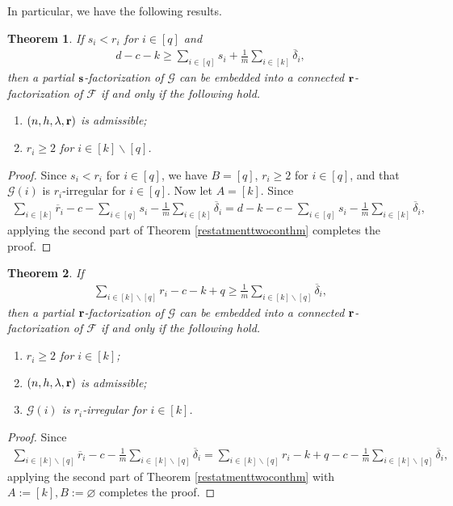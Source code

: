 \documentclass[12pt,oneside]{amsart}
\newtheorem{theorem}{Theorem}[section]
\newcommand{\cc}{\mathcal}
\begin{document}
In particular, we have the following results.
\begin{theorem} \label{restatmenttwoconthmakappabkapp}
If  $s_i<r_i$ for $i\in [q]$ and 
\begin{align*}
d-c-k\geq \sum_{i\in [q]} s_i +\frac{1}{m}\sum_{i\in [k]} \overline{\delta}_i,
\end{align*}
then a partial $\vb{s}$-factorization of $\cc G$ can be embedded into a connected $\vb{r}$-factorization of $\cc F$  if and only if the following hold.
\begin{enumerate}
    \item [\textup{(i)}] $(n,h,\lambda, \vb r)$ is admissible; 
    \item [\textup{(ii)}] $r_i\geq 2$ for $i\in [k] \backslash [q]$. 
\end{enumerate}
\end{theorem}
\begin{proof}
Since $s_i<r_i$ for $i\in [q]$, we have $B=[q]$, $r_i\geq 2$ for $i\in [q]$, and that $\cc G(i)$ is $r_i$-irregular  for $i\in [q]$. Now let $A=[k]$. Since 
\begin{align*} 
    \sum_{i\in [k]} \overline{r}_i -c- \sum_{i\in [q]} s_i -\frac{1}{m}\sum_{i\in [k]} \overline{\delta}_i= d-k -c- \sum_{i\in [q]} s_i -\frac{1}{m}\sum_{i\in [k]} \overline{\delta}_i,
\end{align*}
applying the second part of Theorem \ref{restatmenttwoconthm} completes the proof.
\end{proof}

\begin{theorem} \label{restatmenttwoconthmakappabemp}
If 
\begin{align*}
\sum_{i\in [k] \backslash [q]} r_i-c-k+q\geq \frac{1}{m}\sum_{i\in [k] \backslash [q]} \overline{\delta}_i,
\end{align*}
then a partial $\vb{r}$-factorization of $\cc G$ can be embedded into a connected $\vb{r}$-factorization of $\cc F$  if and only if the following hold.
\begin{enumerate}
    \item [\textup{(i)}] $r_i\geq 2$ for $i\in [k]$;
    \item [\textup{(ii)}]  $(n,h,\lambda, \vb r)$ is admissible;
    \item [\textup{(iii)}] $\cc G(i)$ is $r_i$-irregular for $i\in [k]$.
\end{enumerate}
\end{theorem}
\begin{proof}
Since
\begin{align*}
\sum_{i\in [k] \backslash [q]} \overline{r}_i-c- \frac{1}{m}\sum_{i\in [k] \backslash [q]} \overline{\delta}_i=\sum_{i\in [k] \backslash [q]} r_i-k+q-c- \frac{1}{m}\sum_{i\in [k] \backslash [q]} \overline{\delta}_i,
\end{align*}
applying  the second part of Theorem \ref{restatmenttwoconthm} with $A:=[k], B:=\varnothing$ completes the proof.
\end{proof}
\end{document}
